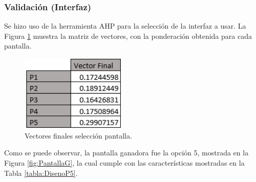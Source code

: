 \subsubsection{Validación (Interfaz)}
Se hizo uso de la herramienta AHP para la selección de la interfaz a usar. La Figura \ref{fig:PantallaT} muestra la matriz de vectores, con la ponderación obtenida para cada pantalla.
\begin{figure}[H]
	\centering
	\includegraphics[width=5cm]{imagenes/TablasPantalla4}
	\caption{Vectores finales selección pantalla.}
	\label{fig:PantallaT}
\end{figure}

Como se puede observar, la pantalla ganadora fue la opción 5, mostrada en la Figura \ref{fig:PantallaG}, la cual cumple con las características mostradas en la Tabla \ref{tabla:DisenoP5}.

